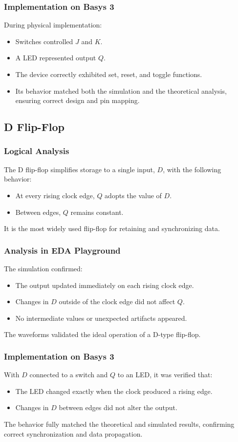 \documentclass[12pt]{article}  %
\begin{document}
\subsubsection{Implementation on Basys 3}
During physical implementation:
\begin{itemize}
    \item Switches controlled $J$ and $K$.
    \item A LED represented output $Q$.
    \item The device correctly exhibited set, reset, and toggle functions.
    \item Its behavior matched both the simulation and the theoretical analysis, ensuring correct design and pin mapping.
\end{itemize}

\subsection{D Flip-Flop}

\subsubsection{Logical Analysis}
The D flip-flop simplifies storage to a single input, $D$, with the following behavior:
\begin{itemize}
    \item At every rising clock edge, $Q$ adopts the value of $D$.
    \item Between edges, $Q$ remains constant.
\end{itemize}
It is the most widely used flip-flop for retaining and synchronizing data.

\subsubsection{Analysis in EDA Playground}
The simulation confirmed:
\begin{itemize}
    \item The output updated immediately on each rising clock edge.
    \item Changes in $D$ outside of the clock edge did not affect $Q$.
    \item No intermediate values or unexpected artifacts appeared.
\end{itemize}
The waveforms validated the ideal operation of a D-type flip-flop.

\subsubsection{Implementation on Basys 3}
With $D$ connected to a switch and $Q$ to an LED, it was verified that:
\begin{itemize}
    \item The LED changed exactly when the clock produced a rising edge.
    \item Changes in $D$ between edges did not alter the output.
\end{itemize}
The behavior fully matched the theoretical and simulated results, confirming correct synchronization and data propagation.
\end{document}

